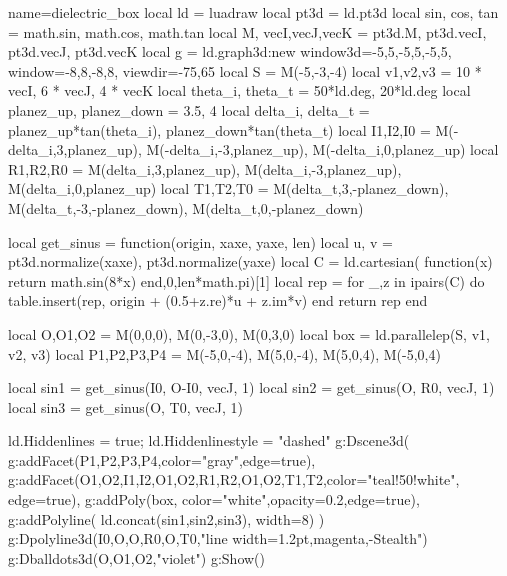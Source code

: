 \documentclass{standalone}
\begin{document}
    \begin{luadraw}{name=dielectric_box}
    local ld = luadraw
    local pt3d = ld.pt3d
    local sin, cos, tan = math.sin, math.cos, math.tan
    local M, vecI,vecJ,vecK = pt3d.M, pt3d.vecI, pt3d.vecJ, pt3d.vecK
    local g = ld.graph3d:new{
        window3d={-5,5,-5,5,-5,5},
        window={-8,8,-8,8}, viewdir={-75,65}
    }
    local S = M(-5,-3,-4)
    local v1,v2,v3 = 10 * vecI, 6 * vecJ, 4 * vecK
    local theta_i, theta_t = 50*ld.deg, 20*ld.deg
    local planez_up, planez_down = 3.5, 4
    local delta_i, delta_t = planez_up*tan(theta_i), planez_down*tan(theta_t)
    local I1,I2,I0 = M(-delta_i,3,planez_up), M(-delta_i,-3,planez_up), M(-delta_i,0,planez_up)
    local R1,R2,R0 = M(delta_i,3,planez_up), M(delta_i,-3,planez_up), M(delta_i,0,planez_up)
    local T1,T2,T0 = M(delta_t,3,-planez_down), M(delta_t,-3,-planez_down), M(delta_t,0,-planez_down)
    
    local get_sinus = function(origin, xaxe, yaxe, len)
        local u, v = pt3d.normalize(xaxe), pt3d.normalize(yaxe)
        local C = ld.cartesian( function(x) return math.sin(8*x) end,0,len*math.pi)[1]
        local rep = {}
        for _,z in ipairs(C) do
            table.insert(rep, origin + (0.5+z.re)*u + z.im*v)
        end
        return {rep}
    end
    
    local O,O1,O2 = M(0,0,0), M(0,-3,0), M(0,3,0)
    local box = ld.parallelep(S, v1, v2, v3)
    local P1,P2,P3,P4 = M(-5,0,-4), M(5,0,-4), M(5,0,4), M(-5,0,4)
    
    local sin1 = get_sinus(I0, O-I0, vecJ, 1)
    local sin2 = get_sinus(O, R0, vecJ, 1)
    local sin3 = get_sinus(O, T0, vecJ, 1)
    
    ld.Hiddenlines = true; ld.Hiddenlinestyle = "dashed"
    g:Dscene3d(
        g:addFacet({P1,P2,P3,P4},{color="gray",edge=true}),
        g:addFacet({{O1,O2,I1,I2},{O1,O2,R1,R2},{O1,O2,T1,T2}},{color="teal!50!white", edge=true}),
        g:addPoly(box, {color="white",opacity=0.2,edge=true}),
        g:addPolyline( ld.concat(sin1,sin2,sin3), {width=8})
    )
    g:Dpolyline3d({{I0,O},{O,R0},{O,T0}},"line width=1.2pt,magenta,-Stealth")
    g:Dballdots3d({O,O1,O2},"violet")
    g:Show()
    \end{luadraw}
\end{document}
